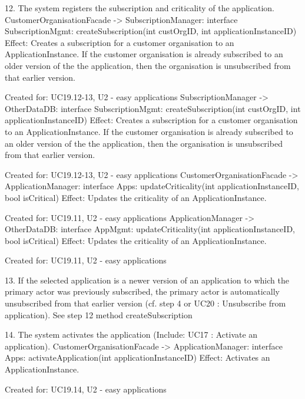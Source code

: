 {{{            12. The system registers the subscription and criticality of the application.
                    CustomerOrganisationFacade -> SubscriptionManager:        interface SubscriptionMgmt: createSubscription(int custOrgID, int applicationInstanceID)
                        Effect: Creates a subscription for a customer organisation to an ApplicationInstance. If the customer organisation is already subscribed to an older version of the the application, then the organisation is unsubscribed from that earlier version.
                        \item Created for: UC19.12-13, U2 - easy applications
                    SubscriptionManager -> OtherDataDB:                       interface SubscriptionMgmt: createSubscription(int custOrgID, int applicationInstanceID)
                        Effect: Creates a subscription for a customer organisation to an ApplicationInstance. If the customer organisation is already subscribed to an older version of the the application, then the organisation is unsubscribed from that earlier version.
                        \item Created for: UC19.12-13, U2 - easy applications
                    CustomerOrganisationFacade -> ApplicationManager:         interface Apps:             updateCriticality(int applicationInstanceID, bool isCritical)
                        Effect: Updates the criticality of an ApplicationInstance.
                        \item Created for: UC19.11, U2 - easy applications
                    ApplicationManager -> OtherDataDB:                        interface AppMgmt:          updateCriticality(int applicationInstanceID, bool isCritical)
                        Effect: Updates the criticality of an ApplicationInstance.
                        \item Created for: UC19.11, U2 - easy applications

            13. If the selected application is a newer version of an application to which the primary actor was previously subscribed,
                the primary actor is automatically unsubscribed from that earlier version (cf. step 4 or UC20 : Unsubscribe from application).
                    See step 12 method createSubscription

            14. The system activates the application (Include: UC17 : Activate an application).
                    CustomerOrganisationFacade -> ApplicationManager: interface Apps: activateApplication(int applicationInstanceID)
                        Effect: Activates an ApplicationInstance.
                        \item Created for: UC19.14, U2 - easy applications

}}}
